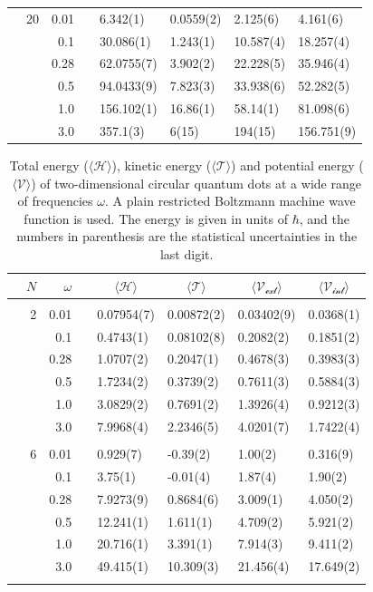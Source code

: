 \begin{table}
\begin{tabularx}{\textwidth}{R{1.5cm}rrcR{2.3cm}R{2.3cm}R{2.3cm}R{2.3cm}}
		&20 & 0.01 && 6.342(1) & 0.0559(2) & 2.125(6) & 4.161(6) \\
		&& 0.1 && 30.086(1) & 1.243(1) & 10.587(4) & 18.257(4) \\
		&& 0.28 && 62.0755(7) & 3.902(2) & 22.228(5) & 35.946(4) \\
		&& 0.5 && 94.0433(9) & 7.823(3) & 33.938(6) & 52.282(5) \\
		&& 1.0 && 156.102(1) & 16.86(1) & 58.14(1) & 81.098(6) \\
		&& 3.0 && 357.1(3) & 6(15) & 194(15) & 156.751(9) \\ \hline \hline
	\end{tabularx}
\end{table} 

\begin{table}
	\caption{Total energy ($\langle\mathcal{H}\rangle$), kinetic energy ($\langle\mathcal{T}\rangle$) and potential energy ($\langle\mathcal{V}\rangle$) of two-dimensional circular quantum dots at a wide range of frequencies $\omega$. A plain restricted Boltzmann machine wave function is used. The energy is given in units of $\hbar$, and the numbers in parenthesis are the statistical uncertainties in the last digit.}
	\label{tab:splitfrequencyQDRBM}
	\begin{tabularx}{\textwidth}{R{1.5cm}rrcR{2.3cm}R{2.3cm}R{2.3cm}R{2.3cm}} \hline\hline
		& & $\omega$ &&  &  &  &  \\ \hline \\
		&2 & 0.01 && 0.07954(7) & 0.00872(2) & 0.03402(9) & 0.0368(1) \\
		&& 0.1 && 0.4743(1) & 0.08102(8) & 0.2082(2) & 0.1851(2) \\
		&& 0.28 && 1.0707(2) & 0.2047(1) & 0.4678(3) & 0.3983(3) \\
		&& 0.5 && 1.7234(2) & 0.3739(2) & 0.7611(3) & 0.5884(3)\\
		&& 1.0 && 3.0829(2) & 0.7691(2) & 1.3926(4) & 0.9212(3)\\
		&& 3.0 && 7.9968(4) & 2.2346(5) & 4.0201(7) & 1.7422(4) \\ \hdashline \\
		
		&6 & 0.01 && 0.929(7) & -0.39(2) & 1.00(2) & 0.316(9) \\
		&& 0.1 && 3.75(1) & -0.01(4) & 1.87(4) & 1.90(2) \\
		&& 0.28 && 7.9273(9) & 0.8684(6) & 3.009(1) & 4.050(2) \\
		&& 0.5 && 12.241(1) & 1.611(1) & 4.709(2) & 5.921(2)\\
		&& 1.0 && 20.716(1) & 3.391(1) & 7.914(3) & 9.411(2)\\
		&& 3.0 && 49.415(1) & 10.309(3) & 21.456(4) & 17.649(2) \\ \hdashline \\
		

\end{tabularx}
\end{table}
